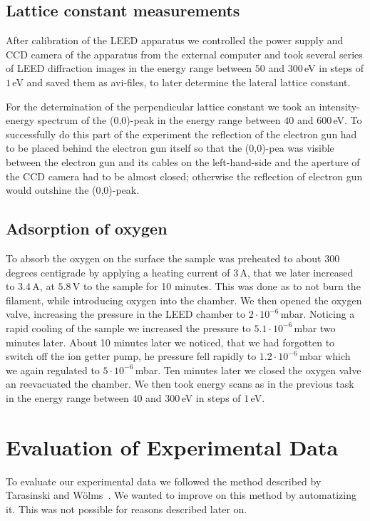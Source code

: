 \documentclass[a4paper,10pt]{scrartcl}
\begin{document}
\subsection{Lattice constant measurements}

After calibration of the LEED apparatus we controlled the power supply and CCD camera of the apparatus from the external computer and took several series of LEED diffraction images in the energy range between $50$ and $300\,$eV in steps of $1\,$eV and saved them as avi-files, to later determine the lateral lattice constant.

For the determination of the perpendicular lattice constant we took an intensity-energy spectrum of the (0,0)-peak in the energy range between $40$ and $600\,$eV. To successfully do this part of the experiment the reflection of the electron gun had to be placed behind the electron gun itself so that the (0,0)-pea was visible between the electron gun and its cables on the left-hand-side and the aperture of the CCD camera had to be almost closed; otherwise the reflection of electron gun would outshine the (0,0)-peak.

\subsection{Adsorption of oxygen}

To absorb the oxygen on the surface the sample was preheated to about 300 degrees centigrade by applying a heating current of $3\,$A, that we later increased to $3.4\,$A, at $5.8\,$V to the sample for 10 minutes. This was done as to not burn the filament, while introducing oxygen into the chamber. We then opened the oxygen valve, increasing the pressure in the LEED chamber to $2 \cdot 10^{-6}\,$mbar. Noticing a rapid cooling of the sample we increased the pressure to $5.1 \cdot 10^{-6}\,$mbar two minutes later. About 10 minutes later we noticed, that we had forgotten to switch off the ion getter pump, he pressure fell rapidly to $1.2 \cdot 10^{-6}\,$mbar which we again regulated to $5 \cdot 10^{-6}\,$mbar. Ten minutes later we closed the oxygen valve an reevacuated the chamber. We then took energy scans as in the previous task in the energy range between $40$ and $300\,$eV in steps of $1\,$eV.

\section{Evaluation of Experimental Data}

To evaluate our experimental data we followed the method described by Tarasinski and Wölms~\cite{brian}. We wanted to improve on this method by automatizing it. This was not possible for reasons described later on.
\end{document}
